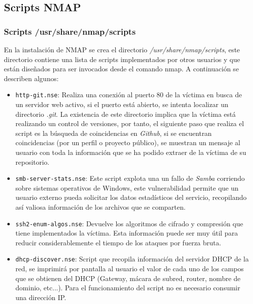 \documentclass[a4,12pt,onecolum]{article}
\begin{document}
\begin{itemize}

\subsection{Scripts NMAP}
\subsubsection{Scripts /usr/share/nmap/scripts}
En la instalación de NMAP se crea el directorio \textit{/usr/share/nmap/scripts}, este directorio contiene una lista de scripts implementados por otros usuarios y que están diseñados para ser invocados desde el comando nmap. A continuación se describen algunos:
\begin{itemize}
\item \texttt{http-git.nse}: Realiza una conexión al puerto 80 de la víctima en busca de un servidor web activo, si el puerto está abierto, se intenta localizar un directorio \emph{.git}. La existencia de este directorio implica que la víctima está realizando un control de versiones, por tanto, el siguiente paso que realiza el script es la búsqueda de coincidencias en \emph{Github}, si se encuentran coincidencias (por un perfil o proyecto público), se muestran un mensaje al usuario con toda la información que se ha podido extraer de la víctima de su repositorio. 
\item \texttt{smb-server-stats.nse}: Este script explota una un fallo de \emph{Samba} corriendo sobre sistemas operativos de Windows, este vulnerabilidad permite que un usuario externo pueda solicitar los datos estadísticos del servicio, recopilando así valiosa información de los archivos que se comparten.
\item \texttt{ssh2-enum-algos.nse}: Devuelve los algoritmos de cifrado y compresión que tiene implementados la víctima. Esta información puede ser muy útil para reducir considerablemente el tiempo de los ataques por fuerza bruta.
\item \texttt{dhcp-discover.nse}: Script que recopila información del servidor DHCP de la red, se imprimirá por pantalla al usuario el valor de cada uno de los campos que se obtienen del DHCP (Gateway, mácara de subred, router, nombre de dominio, etc...). Para el funcionamiento del script no es necesario consumir una dirección IP.
\end{itemize}

\end{itemize}
\end{document}
